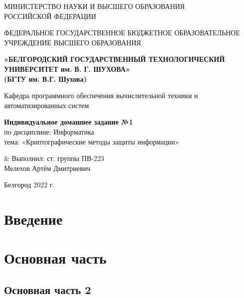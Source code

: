 \documentclass[a4paper, 12pt]{article}
\begin{document}
\begin{title}
\newpage
\thispagestyle{empty}
\begin{center}
МИНИСТЕРСТВО НАУКИ И ВЫСШЕГО ОБРАЗОВАНИЯ \\
РОССИЙСКОЙ ФЕДЕРАЦИИ
\end{center}
\vfil
\begin{center}\small
ФЕДЕРАЛЬНОЕ ГОСУДАРСТВЕННОЕ БЮДЖЕТНОЕ ОБРАЗОВАТЕЛЬНОЕ УЧРЕЖДЕНИЕ
ВЫСШЕГО ОБРАЗОВАНИЯ
\end{center}
\vfil
\begin{center}\textbf{
«БЕЛГОРОДСКИЙ ГОСУДАРСТВЕННЫЙ
ТЕХНОЛОГИЧЕСКИЙ УНИВЕРСИТЕТ им. В. Г. ШУХОВА» \\
(БГТУ им. В.Г. Шухова)
}\end{center}
\vfil
\begin{center}\small
Кафедра программного обеспечения вычислительной техники и
автоматизированных систем
\end{center}
\vfill
\begin{center}
\textbf{Индивидуальное домашнее задание №1} \\
по дисциплине: Информатика \\
тема: «Криптографические методы защиты информации»
\end{center}
\vfill
\begin{tabularx}{\textwidth} {
&
Выполнил: ст. группы ПВ-223 \\
Мелехов Артём Дмитриевич
}
\end{tabularx}
\begin{center}
\vfill
Белгород 2022 г.
\end{center}
\end{title}



\newpage
\renewcommand\contentsname{Оглавление}
\tableofcontents


\newpage
\section*{Введение}


\newpage
\section{Основная часть}
\subsection{Основная часть 2}
\end{document}
